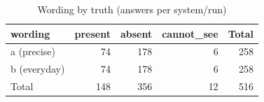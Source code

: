 \begin{table}[htbp]
\centering
\caption{Wording by truth (answers per system/run)}
\label{tab:benchname-composition-4}
\begin{tabular}{lrrrr}
\toprule
wording & present & absent & cannot\_see & Total \\
\midrule
a (precise) & 74 & 178 & 6 & 258 \\
b (everyday) & 74 & 178 & 6 & 258 \\
\midrule
Total & 148 & 356 & 12 & 516 \\
\bottomrule
\end{tabular}
\end{table}
